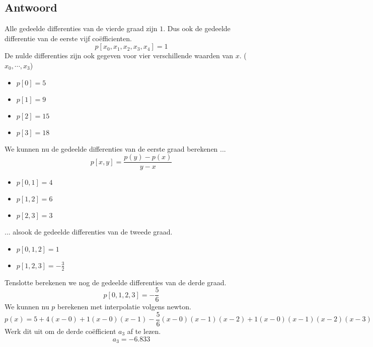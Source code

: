 \documentclass[examenvragen.tex]{subfiles}
\begin{document}
\subsection{Antwoord}
Alle gedeelde differenties van de vierde graad zijn $1$. Dus ook de gedeelde differentie van de eerste vijf co\"efficienten.
\[
p[x_{0},x_{1},x_{2},x_{3},x_{4}] = 1
\]
De nulde differenties zijn ook gegeven voor vier verschillende waarden van $x$. ($x_0,\cdots,x_3$)
\begin{multicols}{4}
\begin{itemize}
\item $p[0]=5$
\item $p[1]=9$
\item $p[2]=15$
\item $p[3]=18$
\end{itemize}
\end{multicols}
\noindent We kunnen nu de gedeelde differenties van de eerste graad berekenen ...
\[
p[x,y] = \frac{p(y) - p(x)}{y-x}
\]
\begin{multicols}{3}
\begin{itemize}
\item $p[0,1] = 4$
\item $p[1,2] = 6$
\item $p[2,3] = 3$
\end{itemize}
\end{multicols}
\noindent ... alsook de gedeelde differenties van de tweede graad.
\begin{multicols}{2}
\begin{itemize}
\item $p[0,1,2] = 1$
\item $p[1,2,3] = -\frac{3}{2}$
\end{itemize}
\end{multicols}
Tenslotte berekenen we nog de gedeelde differenties van de derde graad.
\[
p[0,1,2,3] = -\frac{5}{6}
\]
We kunnen nu $p$ berekenen met interpolatie volgens newton.
\[
p(x) = 5+4(x-0)+1(x-0)(x-1)-\frac{5}{6}(x-0)(x-1)(x-2) + 1(x-0)(x-1)(x-2)(x-3)
\]
Werk dit uit om de derde co\"efficient $a_3$ af te lezen.
\[
a_3 = -6.833
\]
\end{document}
